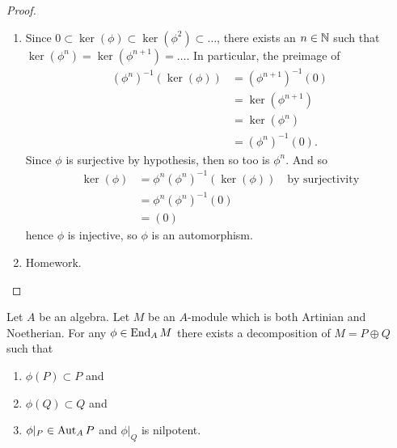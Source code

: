 \begin{proof}
\begin{enumerate}
\item Since $0\subset\ker(\phi)\subset\ker(\phi^{2})\subset\dots$,
  there exists an $n\in\mathbb{N}$ such that $\ker(\phi^{n})=\ker(\phi^{n+1})=\dots$.
  In particular, the preimage of
\begin{subequations}
  \begin{align}
(\phi^{n})^{-1}(\ker(\phi)) &= (\phi^{n+1})^{-1}(0)\\
&=\ker(\phi^{n+1})\\
    &=\ker(\phi^{n})\\
    &=(\phi^{n})^{-1}(0).
  \end{align}
\end{subequations}
Since $\phi$ is surjective by hypothesis, then so too is
$\phi^{n}$. And so
\begin{subequations}
  \begin{align}
\ker(\phi) &=\phi^{n}(\phi^{n})^{-1}(\ker(\phi))\quad\mbox{by surjectivity}\\
&=\phi^{n}(\phi^{n})^{-1}(0)\\
&=(0)
  \end{align}
\end{subequations}
hence $\phi$ is injective, so $\phi$ is an automorphism.
\item Homework.\qedhere
\end{enumerate}
\end{proof}

\begin{lemma}\label{lemma:5.5}
Let $A$ be an algebra. Let $M$ be an $A$-module which is both Artinian
and Noetherian. For any $\phi\in\operatorname{End}_{A}M$ there exists a
decomposition of $M=P\oplus Q$ such that
\begin{enumerate}
\item $\phi(P)\subset P$ and
\item $\phi(Q)\subset Q$ and
\item $\phi|_{P}\in\operatorname{Aut}_{A}P$ and $\phi|_{Q}$ is nilpotent.
\end{enumerate}
\end{lemma}

